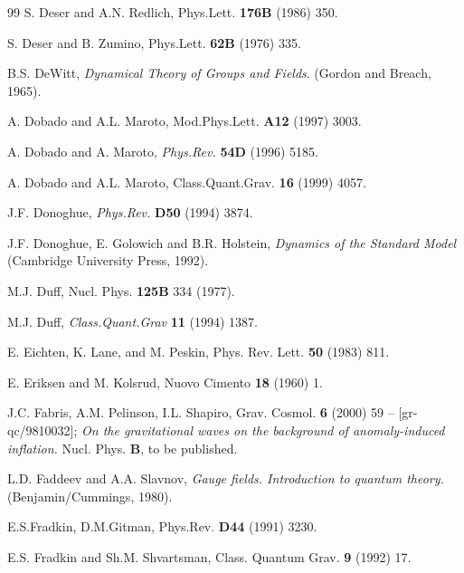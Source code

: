 \begin{thebibliography}{99}
S. Deser and A.N. Redlich, Phys.Lett. {\bf 176B} (1986) 350.

S. Deser and B. Zumino, Phys.Lett. {\bf 62B} (1976) 335.

B.S. DeWitt, {\sl Dynamical Theory of Groups
and Fields}. (Gordon and Breach, 1965).

A. Dobado and A.L. Maroto, Mod.Phys.Lett. {\bf A12} (1997) 3003. %

 A. Dobado and A. Maroto,
{\sl Phys.Rev.} {\bf 54D} (1996) 5185. %

A. Dobado and A.L. Maroto,
Class.Quant.Grav. {\bf 16} (1999) 4057.  %

 J.F. Donoghue, 
{\sl Phys.Rev.} {\bf D50} (1994) 3874.

 J.F. Donoghue, E. Golowich and B.R. Holstein, 
{\sl Dynamics of the Standard Model} (Cambridge University Press, 1992).

M.J. Duff, Nucl. Phys. {\bf 125B} 334 (1977).

M.J. Duff, {\sl Class.Quant.Grav} {\bf 11} (1994) 1387.

 E. Eichten, K. Lane, and M. Peskin, 
Phys. Rev. Lett.  {\bf 50} (1983) 811.  

 E. Eriksen and M. Kolsrud, 
Nuovo Cimento {\bf 18} (1960) 1.

 J.C. Fabris, A.M. Pelinson, I.L. Shapiro,
Grav. Cosmol. {\bf 6} (2000) 59 -- [gr-qc/9810032];
{\sl On the gravitational waves on the background 
of anomaly-induced inflation.} Nucl. Phys. {\bf B}, 
to be published.

 L.D. Faddeev and A.A. Slavnov,
{\it Gauge fields. Introduction to quantum theory.}
(Benjamin/Cummings, 1980).

E.S.Fradkin, D.M.Gitman, Phys.Rev. {\bf D44} (1991) 3230.

E.S. Fradkin and Sh.M. Shvartsman,
Class. Quantum Grav. {\bf 9} (1992) 17.


\end{thebibliography}
